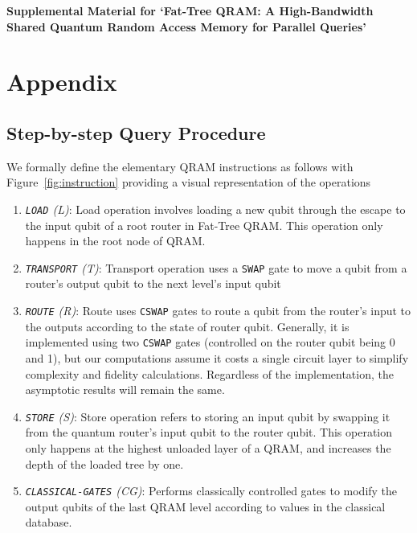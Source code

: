 \begin{center}
{\Large \bf Supplemental Material for `Fat-Tree QRAM: A High-Bandwidth Shared Quantum Random Access Memory for Parallel Queries'}
\end{center}

\section{Appendix}
\label{sec:appendix}


\subsection{Step-by-step Query Procedure}
\label{subsec:BBdetail}

We formally define the elementary QRAM instructions as follows with Figure~\ref{fig:instruction} providing a visual representation of the operations


\begin{enumerate}
    \item \emph{\texttt{LOAD} (L)}: Load operation involves loading a new qubit through the escape to the input qubit of a root router in Fat-Tree QRAM. This operation only happens in the root node of QRAM.
    \item \emph{\texttt{TRANSPORT} (T)}: Transport operation uses a \texttt{SWAP} gate to move a qubit from a router's output qubit to the next level's input qubit
    \item \emph{\texttt{ROUTE} (R)}: Route uses \texttt{CSWAP} gates to route a qubit from the router's input to the outputs according to the state of router qubit. Generally, it is implemented using two \texttt{CSWAP} gates (controlled on the router qubit being 0 and 1), but our computations assume it costs a single circuit layer to simplify complexity and fidelity calculations. Regardless of the implementation, the asymptotic results will remain the same.
    \item \emph{\texttt{STORE} (S)}: Store operation refers to storing an input qubit by swapping it from the quantum router's input qubit to the router qubit. This operation only happens at the highest unloaded layer of a QRAM, and increases the depth of the loaded tree by one.
    \item \emph{\texttt{CLASSICAL-GATES} (CG)}: Performs classically controlled gates to modify the output qubits of the last QRAM level according to values in the classical database.
\end{enumerate}




